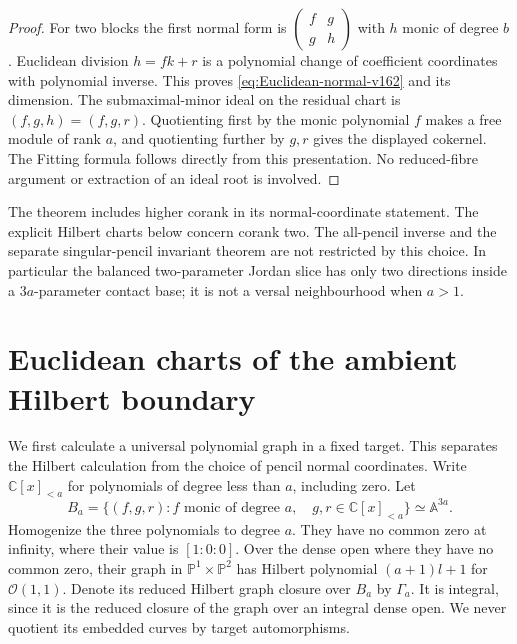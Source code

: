 \documentclass[11pt,reqno]{amsart}
\numberwithin{equation}{section}
\theoremstyle{definition}\newtheorem{definition}[theorem]{Definition}
\theoremstyle{remark}\newtheorem{remark}[theorem]{Remark}
\newcommand{\C}{\mathbb C}\newcommand{\Q}{\mathbb Q}
\newcommand{\Pj}{\mathbb P}\newcommand{\A}{\mathbb A}
\newcommand{\OO}{\mathcal O}\newcommand{\II}{\mathcal I}
\begin{document}
\begin{proof}
For two blocks the first normal form is
$\left(\begin{smallmatrix}f&g\\g&h\end{smallmatrix}\right)$ with
$h$ monic of degree $b$. Euclidean division $h=fk+r$ is a polynomial
change of coefficient coordinates with polynomial inverse. This
proves \eqref{eq:Euclidean-normal-v162} and its dimension. The
submaximal-minor ideal on the residual chart is $(f,g,h)=(f,g,r)$.
Quotienting first by the monic polynomial $f$ makes a free module
of rank $a$, and quotienting further by $g,r$ gives the displayed
cokernel. The Fitting formula follows directly from this presentation.
No reduced-fibre argument or extraction of an ideal root is involved.
\end{proof}

The theorem includes higher corank in its normal-coordinate statement.
The explicit Hilbert charts below concern corank two. The all-pencil
inverse and the separate singular-pencil invariant theorem are not
restricted by this choice. In particular the balanced two-parameter
Jordan slice has only two directions inside a $3a$-parameter contact
base; it is not a versal neighbourhood when $a>1$.

\section{Euclidean charts of the ambient Hilbert boundary}
\label{sec:Euclidean-boundary-v162}
We first calculate a universal polynomial graph in a fixed target.
This separates the Hilbert calculation from the choice of pencil
normal coordinates. Write $\C[x]_{<a}$ for polynomials of degree
less than $a$, including zero. Let
\[
 B_a=\{(f,g,r): f\text{ monic of degree }a,\quad
                          g,r\in\C[x]_{<a}\}\simeq\A^{3a}.
\]
Homogenize the three polynomials to degree $a$. They have no common
zero at infinity, where their value is $[1:0:0]$. Over the dense open
where they have no common zero, their graph in $\Pj^1\times\Pj^2$
has Hilbert polynomial $(a+1)l+1$ for $\OO(1,1)$. Denote its reduced
Hilbert graph closure over $B_a$ by $\Gamma_a$. It is integral,
since it is the reduced closure of the graph over an integral dense
open. We never quotient its embedded curves by target automorphisms.
\end{document}
